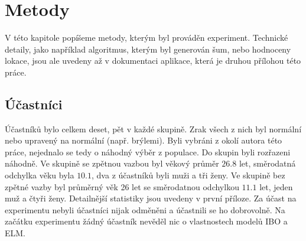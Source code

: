 \chapter{Metody}

V této kapitole popíšeme metody, kterým byl prováděn experiment. Technické detaily,
jako například algoritmus, kterým byl generován šum, nebo hodnoceny lokace, jsou
ale uvedeny až v dokumentaci aplikace, která je druhou přílohou této práce.

\section{Účastníci}

Účastníků bylo celkem deset, pět v každé skupině. Zrak všech z nich byl
normální nebo upravený na normální (např.  brýlemi). Byli vybráni z okolí
autora této práce, nejednalo se tedy o náhodný výběr z populace. Do skupin byli
rozřazeni náhodně. Ve skupině se zpětnou vazbou byl věkový průměr $26.8$ let,
směrodatná odchylka věku byla $10.1$, dva z účastníků byli muži a tři ženy. Ve
skupině bez zpětné vazby byl průměrný věk 26 let se směrodatnou odchylkou
$11.1$ let, jeden muž a čtyři ženy. Detailnější statistiky jsou uvedeny v první
příloze. Za účast na experimentu nebyli účastníci nijak odměněni a účastnili se
ho dobrovolně. Na začátku experimentu žádný účastník nevěděl nic o vlastnostech
modelů IBO a ELM.

